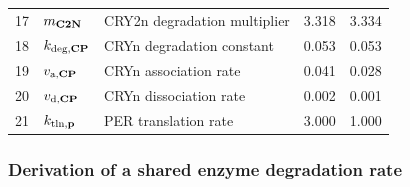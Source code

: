 \begin{table}[p]
\begin{tabular}{cllrr}
    17 & $m_{\text{\bf C2N}}$      & CRY2n degradation multiplier      & 3.318       & 3.334 \\
    18 & $k_{\text{deg,{\bf CP}}}$ & CRYn degradation constant         & 0.053       & 0.053 \\
    19 & $v_{\text{a,{\bf CP}}}$   & CRYn association rate             & 0.041       & 0.028 \\
    20 & $v_{\text{d,{\bf CP}}}$   & CRYn dissociation rate            & 0.002       & 0.001 \\
    21 & $k_{\text{tln,{\bf p}}}$  & PER translation rate              & 3.000       & 1.000 \\ \bottomrule
    \hline
  \end{tabular}
\end{table}


\subsubsection{Derivation of a shared enzyme degradation rate}

